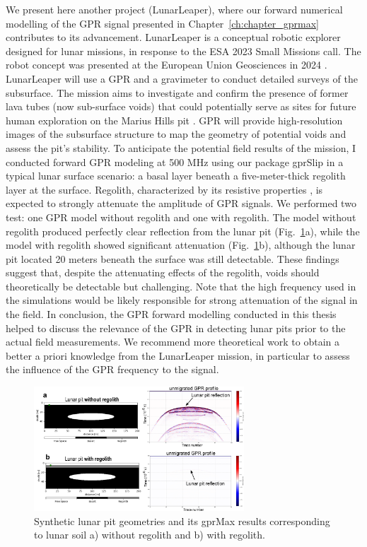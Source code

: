 We present here another project (LunarLeaper), where our forward numerical modelling of the GPR signal presented in Chapter~\ref{ch:chapter_gprmax} contributes to its advancement. LunarLeaper is a conceptual robotic explorer designed for lunar missions, in response to the ESA 2023 Small Missions call. The robot concept was presented at the European Union Geosciences in 2024 \citep{Mittelholz&al2024}. LunarLeaper will use a GPR and a gravimeter to conduct detailed surveys of the subsurface. The mission aims to investigate and confirm the presence of former lava tubes (now sub-surface voids) that could potentially serve as sites for future human exploration on the Marius Hills pit \citep{Wagner&al2014,Sauro&al2020}. GPR will provide high-resolution images of the subsurface structure to map the geometry of potential voids and assess the pit's stability. 
%
To anticipate the potential field results of the mission, I conducted forward GPR modeling at 500 MHz using our package gprSlip in a typical lunar surface scenario: a basal layer beneath a five-meter-thick regolith layer at the surface. Regolith, characterized by its resistive properties \citep{Ding&al2022}, is expected to strongly attenuate the amplitude of GPR signals. We performed two test: one GPR model without regolith and one with regolith. The model without regolith produced perfectly clear reflection from the lunar pit (Fig.~\ref{fig:lunar_pit}a), while the model with regolith showed significant attenuation (Fig.~\ref{fig:lunar_pit}b), although the lunar pit located 20 meters beneath the surface was still detectable. These findings suggest that, despite the attenuating effects of the regolith, voids should theoretically be detectable but challenging. Note that the high frequency used in the simulations would be likely responsible for strong attenuation of the signal in the field. In conclusion, the GPR forward modelling conducted in this thesis helped to discuss the relevance of the GPR in detecting lunar pits prior to the actual field measurements. We recommend more theoretical work to obtain a better a priori knowledge from the LunarLeaper mission, in particular to assess the influence of the GPR frequency to the signal.  


\begin{figure}[H]
    \centering
    \includegraphics[width=0.7\textwidth]{chapters/Discussion/lunar_pit.pdf}
    \caption{Synthetic lunar pit geometries and its gprMax results corresponding to lunar soil a) without regolith and b) with regolith.}
    \label{fig:lunar_pit}
\end{figure}



